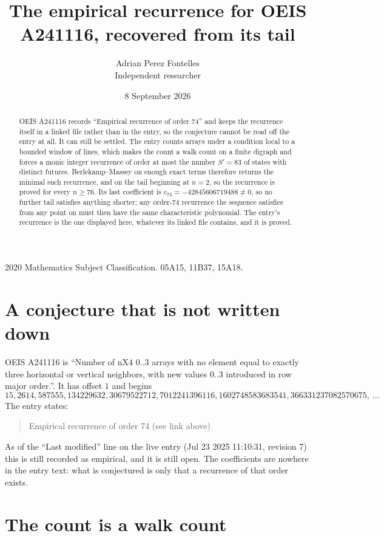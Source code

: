 \documentclass[11pt,a4paper]{article}
\title{The empirical recurrence for OEIS A241116, recovered from its tail}
\author{Adrian Perez Fontelles\\ \small Independent researcher}
\date{8 September 2026}
\theoremstyle{plain}
\theoremstyle{definition}
\begin{document}
\maketitle

\begin{abstract}
OEIS A241116 records ``Empirical recurrence of order $74$'' and keeps the recurrence itself in
a linked file rather than in the entry, so the conjecture cannot be read off the entry at all.
It can still be settled. The entry counts arrays under a condition local to a bounded window of
lines, which makes the count a walk count on a finite digraph and forces a monic integer
recurrence of order at most the number $S'=83$ of states with distinct futures. Berlekamp--Massey on
enough exact terms therefore returns the minimal such recurrence, and on the tail beginning at $n=2$, so the recurrence is proved for every $n\ge76$.
Its last coefficient is $c_{74}=-42845606719488\neq0$, so no further tail satisfies anything
shorter; any order-$74$ recurrence the sequence satisfies from any point on must then have
the same characteristic polynomial. The entry's recurrence is the one displayed here, whatever
its linked file contains, and it is proved.
\end{abstract}

\noindent\small 2020 Mathematics Subject Classification. 05A15, 11B37, 15A18.\normalsize

\section{A conjecture that is not written down}

OEIS A241116 is ``Number of nX4 0..3 arrays with no element equal to exactly three horizontal or vertical neighbors, with new values 0..3 introduced in row major order.''. It has offset $1$ and begins
\[
15, 2614, 587555, 134229632, 30679522712, 7012241396116, 1602748583683541, 366331237082570675,\ \dots
\]
The entry states:
\begin{quote}
Empirical recurrence of order 74 (see link above)
\end{quote}
As of the ``Last modified'' line on the live entry (Jul 23 2025 11:10:31, revision 7)
this is still recorded as empirical, and it is still open. The coefficients are nowhere in the
entry text: what is conjectured is only that a recurrence of that order exists.

\section{The count is a walk count}
\end{document}
